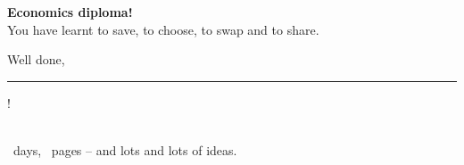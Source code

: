 \begin{center}
\vspace*{3cm}

\medalla{\totaldias}

\vspace{8mm}
{\fontsize{34}{40}\selectfont\bfseries\color{colorLectura} Economics diploma!}\\[8mm]
{\Large You have learnt to save, to choose, to swap and to share.}\\[10mm]
{\Large Well done, \rule{65mm}{0.4pt}!}\\[14mm]
{\large \totaldias\ days, \totaldias\ pages -- and lots and lots of ideas.}
\end{center}
\vspace*{\fill}
\newpage
